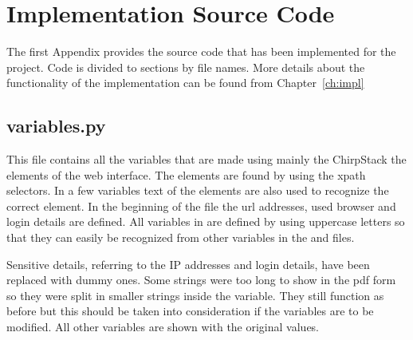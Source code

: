 
\chapter{Implementation Source Code}\label{appx:sourcecode}

The first Appendix provides the source code that has been implemented for the project.
Code is divided to sections by file names.
More details about the functionality of the implementation can be found from Chapter~\ref{ch:impl}

\section{variables.py}

This file contains all the variables that are made using mainly the ChirpStack the elements of the web interface.
The elements are found by using the xpath selectors.
In a few variables text of the elements are also used to recognize the correct element.
In the beginning of the file the \gls{url} addresses, used browser and login details are defined.
All variables in  are defined by using uppercase letters so that they can easily be recognized from other variables in the  and  files.

Sensitive details, referring to the IP addresses and login details, have been replaced with dummy ones.
Some strings were too long to show in the \gls{pdf} form so they were split in smaller strings inside the variable.
They still function as before but this should be taken into consideration if the variables are to be modified.
All other variables are shown with the original values.

